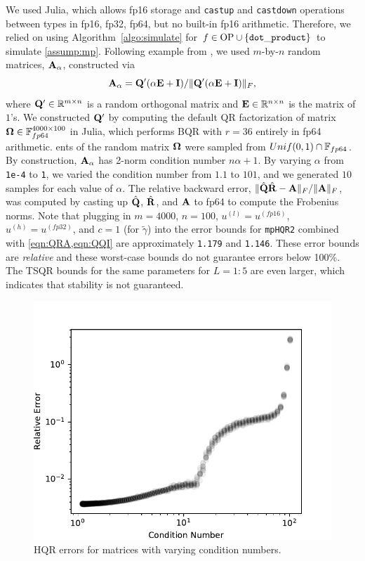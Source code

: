 We used Julia, which allows fp16 storage and {\tt castup} and {\tt castdown} operations between types in {fp16, fp32, fp64}, but no built-in fp16 arithmetic.
Therefore, we relied on using Algorithm~\ref{algo:simulate} for $f\in \text{OP} \cup\{{\tt dot\_product}\}$ to simulate \cref{assump:mp}.
Following example from \cite{Mori2012}, we used $m$-by-$n$ random matrices, $\mathbf{A}_{\alpha}$, constructed via
\begin{equation}
\bb{A}_{\alpha} = \bb{Q'}(\alpha \bb{E} + \bb{I})/\|\bb{Q'}(\alpha \bb{E} + \bb{I})\|_F,
\label{eqn:genRM}
\end{equation}
where $\mathbf{Q'}\in\mathbb{R}^{m\times n}$ is a random orthogonal matrix and $\mathbf{E}\in\mathbb{R}^{n\times n}$ is the matrix of $1$'s. 
We constructed $\mathbf{Q'}$ by computing the default QR factorization of matrix $\mathbf{\Omega}\in\mathbb{F}_{fp64}^{4000\times100}$ in Julia, which performs BQR with $r=36$ entirely in fp64 arithmetic.                                                                                                                    ents of the random matrix $\mathbf{\Omega}$ were sampled from $Unif(0,1)\cap \mathbb{F}_{fp64}$.
By construction, $\mathbf{A}_{\alpha}$ has 2-norm condition number $n\alpha+1$. 
By varying $\alpha$ from {\tt 1e-4} to {\tt 1}, we varied the condition number from $1.1$ to $101$, and we generated $10$ samples for each value of $\alpha$.
The relative backward error, $\|\hat{\mathbf{Q}}\hat{\mathbf{R}}-\mathbf{A}\|_F/\|\mathbf{A}\|_F$, was computed by casting up $\hat{\mathbf{Q}}$, $\hat{\mathbf{R}}$, and $\mathbf{A}$ to fp64 to compute the Frobenius norms.
Note that plugging in $m=4000$, $n=100$, $u^{(l)}=u^{(fp16)}$, $u^{(h)}=u^{(fp32)}$, and $c=1$ (for $\tilde{\gamma}$) into the error bounds for {\tt mpHQR2} combined with \cref{eqn:QRA,eqn:QQI} are approximately {\tt 1.179} and {\tt 1.146}.
These error bounds are \emph{relative} and these worst-case bounds do not guarantee errors below 100\%.
The TSQR bounds for the same parameters for $L=1:5$ are even larger, which indicates that stability is not guaranteed. 
\begin{figure}
	\centering
	\vspace{-10pt}
	\includegraphics[width=.3\textwidth]{./figures/unblocked.pdf}
	\caption{\label{fig:unblocked} HQR errors for matrices with varying condition numbers.}
\end{figure}

